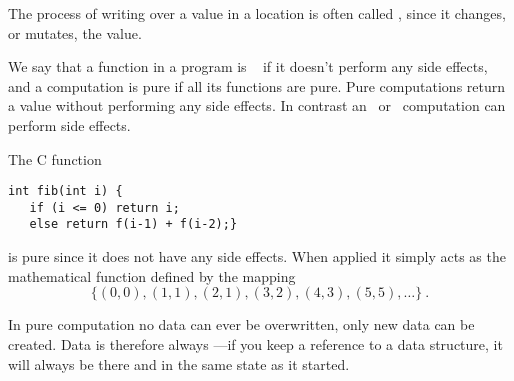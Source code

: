 \begin{cluster}
\label{grp:grm:language::functional-algorithms::process}

\begin{gram}
\label{grm:language::functional-algorithms::process}
The process of writing over a value in a location is often called ,
since it changes, or mutates, the value.

\end{gram}
\end{cluster}

\begin{flex}
\label{grp:def:language::functional-algorithms::pure-computation}

\begin{definition}
\label{def:language::functional-algorithms::pure-computation}
We say that a function in a program is ~ if it doesn't perform any side
  effects, and a computation is pure if all its functions are pure.
Pure computations return a value without performing any side effects.
In contrast an~ or~ computation can
perform side effects.  

\end{definition}

\begin{example}
\label{xmpl:language::functional-algorithms::return}
The C function 
\begin{verbatim}
int fib(int i) {
   if (i <= 0) return i; 
   else return f(i-1) + f(i-2);}
\end{verbatim}
is pure since it does not have any side effects.    When applied it 
simply acts as the mathematical function defined by the mapping 
~\[\{(0,0),(1,1),(2,1),(3,2),(4,3),(5,5), \ldots\}~. \]

\end{example}
\end{flex}

\begin{cluster}
\label{grp:grm:language::functional-algorithms::pure}

\begin{gram}
\label{grm:language::functional-algorithms::pure}
In pure computation no data can ever be overwritten, only new data can 
be created.   Data is therefore always ---if you keep a 
reference to a data structure, it will always be there and in the same 
state as it started. 

\end{gram}
\end{cluster}


